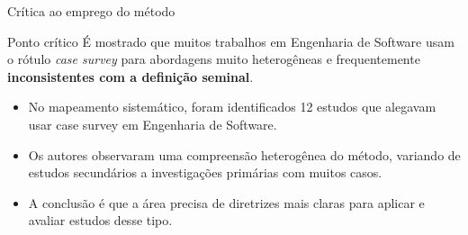 \begin{frame}{Crítica ao emprego do método}
\begin{block}{Ponto crítico}
É mostrado que muitos trabalhos em Engenharia de Software usam o rótulo \textit{case survey} para abordagens muito heterogêneas e frequentemente \textbf{inconsistentes com a definição seminal}.\cite{melegati2020casesurvey}
\end{block}

\begin{itemize}
    \item No mapeamento sistemático, foram identificados 12 estudos que alegavam usar case survey em Engenharia de Software.
    \item Os autores observaram uma compreensão heterogênea do método, variando de estudos secundários a investigações primárias com muitos casos.
    \item A conclusão é que a área precisa de diretrizes mais claras para aplicar e avaliar estudos desse tipo.
\end{itemize}
\end{frame}